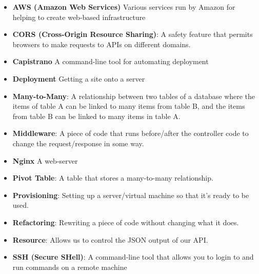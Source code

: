 \begin{itemize}[leftmargin=*]
    \item
        \textbf{AWS (Amazon Web Services)}
        Various services run by Amazon for helping to create web-based infrastructure
    \item
        \textbf{CORS (Cross-Origin Resource Sharing)}:
        A safety feature that permits browsers to make requests to APIs on different domains.
    \item
        \textbf{Capistrano}
        A command-line tool for automating deployment
    \item
        \textbf{Deployment}
        Getting a site onto a server
    \item
        \textbf{Many-to-Many}:
        A relationship between two tables of a database where the items of table A can be linked to many items from table B, and the items from table B can be linked to many items in table A.
    \item
        \textbf{Middleware}:
        A piece of code that runs before/after the controller code to change the request/response in some way.
    \item
        \textbf{Nginx}
        A web-server
    \item
        \textbf{Pivot Table}:
        A table that stores a many-to-many relationship.
    \item
        \textbf{Provisioning}:
        Setting up a server/virtual machine so that it's ready to be used.
    \item
        \textbf{Refactoring}:
        Rewriting a piece of code without changing what it does.
    \item
        \textbf{Resource}:
        Allows us to control the JSON output of our API.
    \item
        \textbf{SSH (Secure SHell)}:
        A command-line tool that allows you to login to and run commands on a remote machine
\end{itemize}
